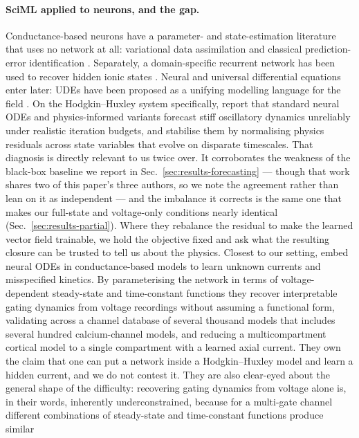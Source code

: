 \documentclass{article}
\begin{document}
\paragraph{SciML applied to neurons, and the gap.}
Conductance-based neurons have a parameter- and state-estimation literature that uses no network at all: variational data assimilation \citep{meliza2014} and
classical prediction-error identification \citep{burghi2021feedback}. Separately, a domain-specific recurrent network has been used to recover hidden ionic states
\citep{iravanian2020}. Neural and universal differential equations enter later: UDEs have been
proposed as a unifying modelling language for the field \citep{elgazzar2025ude}.
On the Hodgkin--Huxley system specifically, \citet{kainth2025pinodesr} report
that standard neural ODEs and physics-informed variants forecast stiff
oscillatory dynamics unreliably under realistic iteration budgets, and stabilise
them by normalising physics residuals across state variables that evolve on
disparate timescales. That diagnosis is directly relevant to us twice over. It corroborates the
weakness of the black-box baseline we report in
Sec.~\ref{sec:results-forecasting} --- though that work shares two of this
paper's three authors, so we note the agreement rather than lean on it as
independent --- and the imbalance it corrects is the same one
that makes our full-state and voltage-only conditions nearly identical
(Sec.~\ref{sec:results-partial}). Where they rebalance the residual to make the
learned vector field trainable, we hold the objective fixed and ask what the
resulting closure can be trusted to tell us about the physics.
Closest to our setting, \citet{beck2026hybrid} embed neural ODEs in
conductance-based models to learn unknown currents and misspecified kinetics.
By parameterising the network in terms of voltage-dependent steady-state and
time-constant functions they recover interpretable gating dynamics from voltage
recordings without assuming a functional form, validating across a channel
database of several thousand models that includes several hundred
calcium-channel models, and reducing a multicompartment cortical model to a
single compartment with a learned axial current. They own the claim that one can
put a network inside a Hodgkin--Huxley model and learn a hidden current, and we
do not contest it. They are also clear-eyed about the general shape of the
difficulty: recovering gating dynamics from voltage alone is, in their words,
inherently underconstrained, because for a multi-gate channel different
combinations of steady-state and time-constant functions produce similar
\end{document}
